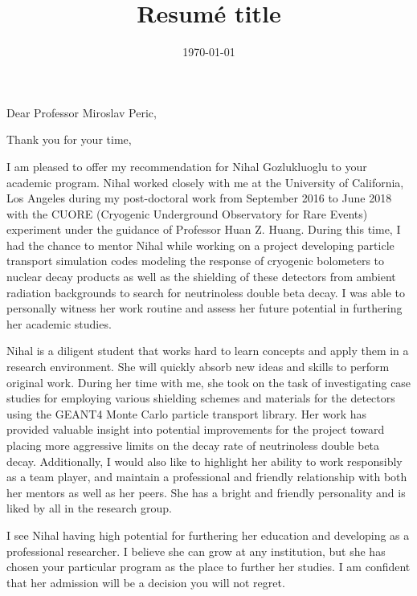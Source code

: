 \documentclass[11pt]{moderncv}        %
\title{Resumé title}                               %
\begin{document}
\date{\today}
\opening{Dear Professor Miroslav Peric,}
\closing{Thank you for your time,}
\makelettertitle

\justifying

I am pleased to offer my recommendation for Nihal Gozlukluoglu to your academic
program. Nihal worked closely with me at the University of California, Los
Angeles during my post-doctoral work from September 2016 to June 2018 with the
CUORE (Cryogenic Underground Observatory for Rare Events) experiment under the
guidance of Professor Huan Z. Huang. During this time, I had the chance to
mentor Nihal while working on a project developing particle transport
simulation codes modeling the response of cryogenic bolometers to nuclear decay
products as well as the shielding of these detectors from ambient radiation
backgrounds to search for neutrinoless double beta decay. I was able to
personally witness her work routine and assess her future potential in
furthering her academic studies.

Nihal is a diligent student that works hard to learn concepts and apply them in
a research environment. She will quickly absorb new ideas and skills to perform
original work. During her time with me, she took on the task of investigating
case studies for employing various shielding schemes and materials for the
detectors using the GEANT4 Monte Carlo particle transport library. Her work has
provided valuable insight into potential improvements for the project toward
placing more aggressive limits on the decay rate of neutrinoless double beta
decay. Additionally, I would also like to highlight her ability to work
responsibly as a team player, and maintain a professional and friendly
relationship with both her mentors as well as her peers. She has a bright and
friendly personality and is liked by all in the research group.

I see Nihal having high potential for furthering her education and developing
as a professional researcher. I believe she can grow at any institution, but
she has chosen your particular program as the place to further her studies. I
am confident that her admission will be a decision you will not regret.
\end{document}
